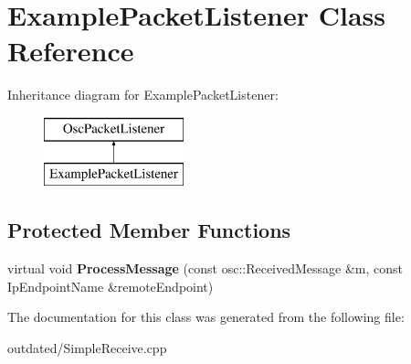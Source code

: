 \hypertarget{classExamplePacketListener}{\section{Example\-Packet\-Listener Class Reference}
\label{classExamplePacketListener}
}
Inheritance diagram for Example\-Packet\-Listener\-:\begin{figure}[H]
\begin{center}
\leavevmode
\includegraphics[height=2.000000cm]{classExamplePacketListener}
\end{center}
\end{figure}
\subsection*{Protected Member Functions}
\begin{DoxyCompactItemize}
\item 
\hypertarget{classExamplePacketListener_a688ed2a3ec01d0fb7661f4fe0ffc90df}{virtual void {\bfseries Process\-Message} (const osc\-::\-Received\-Message \&m, const Ip\-Endpoint\-Name \&remote\-Endpoint)}\label{classExamplePacketListener_a688ed2a3ec01d0fb7661f4fe0ffc90df}

\end{DoxyCompactItemize}


The documentation for this class was generated from the following file\-:\begin{DoxyCompactItemize}
\item 
outdated/Simple\-Receive.\-cpp\end{DoxyCompactItemize}
